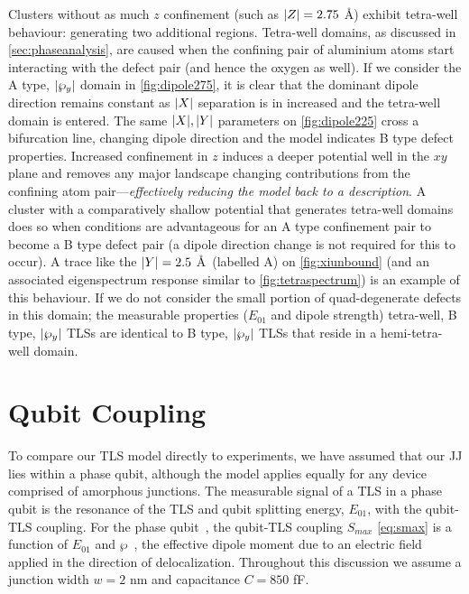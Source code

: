 Clusters without as much $z$ confinement (such as $\lvert Z\rvert = 2.75$ \AA) exhibit tetra-well behaviour: generating two additional regions.
Tetra-well domains, as discussed in \cref{sec:phaseanalysis}, are caused when the confining pair of aluminium atoms start interacting with the defect pair (and hence the oxygen as well).
If we consider the A type, $\lvert\wp_y\rvert$ domain in \cref{fig:dipole275}, it is clear that the dominant dipole direction remains constant as $\lvert X\rvert$ separation is in increased and the tetra-well domain is entered.
The same $\lvert X\rvert,\lvert Y\rvert$ parameters on \cref{fig:dipole225} cross a bifurcation line, changing dipole direction and the model indicates B type defect properties.
Increased confinement in $z$ induces a deeper potential well in the $xy$ plane and removes any major landscape changing contributions from the confining atom pair---\textit{effectively reducing the model back to a  description}.
A cluster with a comparatively shallow potential that generates tetra-well domains does so when conditions are advantageous for an A type confinement pair to become a B type defect pair (a dipole direction change is not required for this to occur).
A trace like the $\lvert Y\rvert = 2.5$ \AA\ (labelled A) on \cref{fig:xiunbound} (and an associated eigenspectrum response similar to \cref{fig:tetraspectrum}) is an example of this behaviour.
If we do not consider the small portion of quad-degenerate defects in this domain; the measurable properties (\ie $E_{01}$ and dipole strength) tetra-well, B type, $\lvert\wp_y\rvert$ TLSs are identical to B type, $\lvert\wp_y\rvert$ TLSs that reside in a hemi-tetra-well domain.


\section{Qubit Coupling}\label{sec:smax}

To compare our TLS model directly to experiments, we have assumed that our JJ lies within a phase qubit, although the model applies equally for any device comprised of amorphous junctions.
The measurable signal of a TLS in a phase qubit is the resonance of the TLS and qubit splitting energy, $E_{01}$, with the qubit-TLS coupling.
For the phase qubit~\cite{Martinis2005}, the qubit-TLS coupling $S_{max}$ \cref{eq:smax} is a function of $E_{01}$ and $\wp$~\cite{Kofman2007}, the effective dipole moment due to an electric field applied in the direction of delocalization.
Throughout this discussion we assume a junction width $w = 2$ nm and capacitance $C = 850$ fF.

